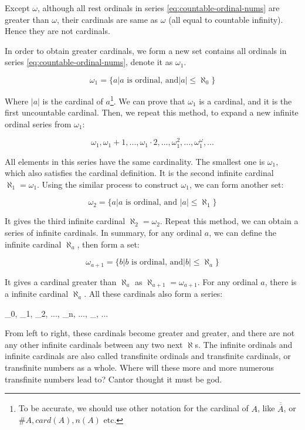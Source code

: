\documentclass{article}
\begin{document}
Except $\omega$, although all rest ordinals in series \ref{eq:countable-ordinal-nums} are greater than $\omega$, their cardinals are same as $\omega$ (all equal to countable infinity). Hence they are not cardinals.

In order to obtain greater cardinals, we form a new set contains all ordinals in series \ref{eq:countable-ordinal-nums}, denote it as $\omega_1$.

\[
\omega_1 = \{ a | a \text{ is ordinal, and} |a| \leq \aleph_0\}
\]

Where $|a|$ is the cardinal of $a$\footnote{To be accurate, we should use other notation for the cardinal of $A$, like $\overline{\overline{A}}$, or $\#A, card(A), n(A)$ etc.}. We can prove that $\omega_1$ is a cardinal, and it is the first uncountable cardinal. Then, we repeat this method, to expand a new infinite ordinal series from $\omega_1$:

\[
\omega_1, \omega_1 + 1, ..., \omega_1 \cdot 2, ..., \omega_1^2, ..., \omega_1^\omega, ...
\]

All elements in this series have the same cardinality. The smallest one is $\omega_1$, which also satisfies the cardinal definition. It is the second infinite cardinal $\aleph_1 = \omega_1$. Using the similar process to construct $\omega_1$, we can form another set:

\[
\omega_2 = \{ a | a \text{ is ordinal, and } |a| \leq \aleph_1\}
\]

It gives the third infinite cardinal $\aleph_2 = \omega_2$. Repeat this method, we can obtain a series of infinite cardinals. In summary, for any ordinal $a$, we can define the infinite cardinal $\aleph_a$, then form a set:

\[
\omega_{a+1} = \{ b | b \text{ is ordinal, and} |b| \leq \aleph_a\}
\]

It gives a cardinal greater than $\aleph_a$ as $\aleph_{a+1} = \omega_{a+1}$. For any ordinal $a$, there is a infinite cardinal $\aleph_a$. All these cardinals also form a series:

\be
\aleph_0, \aleph_1, \aleph_2, ..., \aleph_n, ..., \aleph_{\omega}, ...
\ee

From left to right, these cardinals become greater and greater, and there are not any other infinite cardinals between any two next $\aleph$s. The infinite ordinals and infinite cardinals are also called transfinite ordinals and transfinite cardinals, or transfinite numbers as a whole. Where will these more and more numerous transfinite numbers lead to? Cantor thought it must be god.
\end{document}
